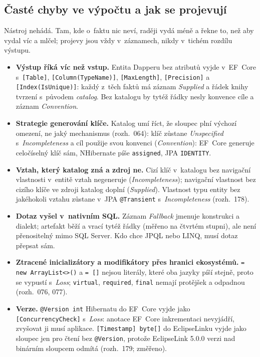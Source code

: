 \documentclass{article}
\begin{document}
\subsection{Časté chyby ve výpočtu a jak se projevují}\label{sec:chyby-vypocet}

Nástroj nehádá. Tam, kde o~faktu nic neví, raději vydá méně a řekne to, než aby vydal víc a mlčel; projevy jsou vždy v~záznamech, nikdy v~tichém rozdílu výstupu.

\begin{itemize}[leftmargin=*,itemsep=2pt]
\item \textbf{Výstup říká víc než vstup.} Entita Dapperu bez atributů vyjde v~EF~Core s~\texttt{[Table]}, \texttt{[Column(TypeName)]}, \texttt{[MaxLength]}, \texttt{[Precision]} a \texttt{[Index(IsUnique)]}: každý z~těch faktů má záznam \emph{Supplied} a řádek knihy tvrzení s~původem \emph{catalog}. Bez katalogu by tytéž řádky nesly konvence cíle a záznam \emph{Convention}.
\item \textbf{Strategie generování klíče.} Katalog umí říct, že sloupec plní výchozí omezení, ne jaký mechanismus (rozh.~064): klíč zůstane \emph{Unspecified} s~\emph{Incompleteness} a cíl použije svou konvenci (\emph{Convention}): EF~Core generuje celočíselný klíč sám, NHibernate píše \texttt{assigned}, JPA \texttt{IDENTITY}.
\item \textbf{Vztah, který katalog zná a zdroj ne.} Cizí klíč v~katalogu bez navigační vlastnosti v~entitě vztah negeneruje (\emph{Incompleteness}); navigační vlastnost bez cizího klíče ve zdroji katalog doplní (\emph{Supplied}). Vlastnost typu entity bez jakéhokoli vztahu zůstane v~JPA \texttt{@Transient} s~\emph{Incompleteness} (rozh.~178).
\item \textbf{Dotaz vyšel v~nativním SQL.} Záznam \emph{Fallback} jmenuje konstrukci a dialekt; artefakt běží a vrací tytéž řádky (měřeno na čtvrtém stupni), ale není přenositelný mimo SQL Server. Kdo chce JPQL nebo LINQ, musí dotaz přepsat sám.
\item \textbf{Ztracené inicializátory a modifikátory přes hranici ekosystémů.} \texttt{= new ArrayList<>()} a \texttt{= []} nejsou literály, které oba jazyky píší stejně, proto se vypustí s~\emph{Loss}; \texttt{virtual}, \texttt{required}, \texttt{final} nemají protějšek a odpadnou (rozh.~076, 077).
\item \textbf{Verze.} \texttt{@Version int} Hibernatu do EF~Core vyjde jako \texttt{[ConcurrencyCheck]} s~\emph{Loss}: anotace EF~Core inkrementaci nevyjádří, zvyšovat ji musí aplikace. \texttt{[Timestamp] byte[]} do EclipseLinku vyjde jako sloupec jen pro čtení bez \texttt{@Version}, protože EclipseLink 5.0.0 verzi nad binárním sloupcem odmítá (rozh.~179; změřeno).

\end{itemize}
\end{document}
